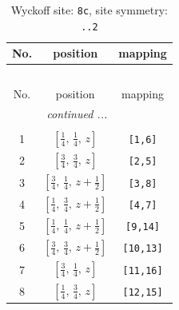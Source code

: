 \documentclass[fleqn,8pt]{jsarticle}
\begin{document}
\renewcommand{\arraystretch}{1.2}
\begin{longtable}{ccc}
\caption{Wyckoff site: {\tt 8c}, site symmetry: {\tt ..2}}
 \\
 \hline \hline
No. & position & mapping \\ \hline \endfirsthead

\multicolumn{2}{l}{\tablename\ \thetable{}} \\
 \hline \hline
No. & position & mapping \\ \hline \endhead

 \hline \hline
\multicolumn{2}{r}{\footnotesize\it continued ...} \\ \endfoot

 \hline \hline
\multicolumn{2}{r}{} \\ \endlastfoot

1 & $\left[ \frac{1}{4},\, \frac{1}{4},\, z \right]$ & {\tt [1,6]} \\ \hline
2 & $\left[ \frac{3}{4},\, \frac{3}{4},\, z \right]$ & {\tt [2,5]} \\ \hline
3 & $\left[ \frac{3}{4},\, \frac{1}{4},\, z + \frac{1}{2} \right]$ & {\tt [3,8]} \\ \hline
4 & $\left[ \frac{1}{4},\, \frac{3}{4},\, z + \frac{1}{2} \right]$ & {\tt [4,7]} \\ \hline
5 & $\left[ \frac{1}{4},\, \frac{1}{4},\, z + \frac{1}{2} \right]$ & {\tt [9,14]} \\ \hline
6 & $\left[ \frac{3}{4},\, \frac{3}{4},\, z + \frac{1}{2} \right]$ & {\tt [10,13]} \\ \hline
7 & $\left[ \frac{3}{4},\, \frac{1}{4},\, z \right]$ & {\tt [11,16]} \\ \hline
8 & $\left[ \frac{1}{4},\, \frac{3}{4},\, z \right]$ & {\tt [12,15]} \\
\end{longtable}
\renewcommand{\arraystretch}{1.2}
\end{document}
